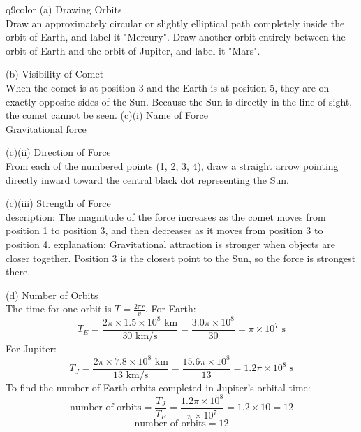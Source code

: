 \documentclass[11pt,a4paper]{article}
\begin{document}
\begin{ansbox}{q9color}
(a) Drawing Orbits\\[4pt]
Draw an approximately circular or slightly elliptical path completely inside the orbit of Earth, and label it "Mercury". Draw another orbit entirely between the orbit of Earth and the orbit of Jupiter, and label it "Mars".

\vspace{4pt}
(b) Visibility of Comet\\[4pt]
When the comet is at position 3 and the Earth is at position 5, they are on exactly opposite sides of the Sun. Because the Sun is directly in the line of sight, the comet cannot be seen.
\clearpage
\vspace{4pt}
(c)(i) Name of Force\\[4pt]
Gravitational force

\vspace{4pt}
(c)(ii) Direction of Force\\[4pt]
From each of the numbered points (1, 2, 3, 4), draw a straight arrow pointing directly inward toward the central black dot representing the Sun.

\vspace{4pt}
(c)(iii) Strength of Force\\[4pt]
description: The magnitude of the force increases as the comet moves from position 1 to position 3, and then decreases as it moves from position 3 to position 4.
explanation: Gravitational attraction is stronger when objects are closer together. Position 3 is the closest point to the Sun, so the force is strongest there.


(d) Number of Orbits\\[4pt]
The time for one orbit is $T = \frac{2\pi r}{v}$.
For Earth:
\[ T_E = \frac{2\pi \times 1.5 \times 10^8 \text{ km}}{30 \text{ km/s}} = \frac{3.0\pi \times 10^8}{30} = \pi \times 10^7 \text{ s} \]
For Jupiter:
\[ T_J = \frac{2\pi \times 7.8 \times 10^8 \text{ km}}{13 \text{ km/s}} = \frac{15.6\pi \times 10^8}{13} = 1.2\pi \times 10^8 \text{ s} \]
To find the number of Earth orbits completed in Jupiter's orbital time:
\[ \text{number of orbits} = \frac{T_J}{T_E} = \frac{1.2\pi \times 10^8}{\pi \times 10^7} = 1.2 \times 10 = 12 \]
\[ \text{number of orbits} = \boxed{12} \]
\end{ansbox}
\end{document}
